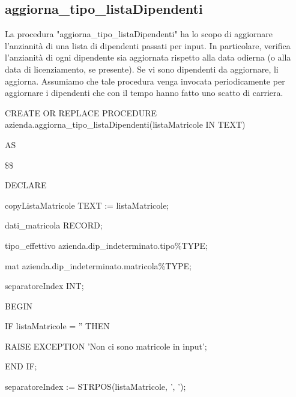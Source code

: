         \subsection{aggiorna\_tipo\_listaDipendenti}
        La procedura "aggiorna\_tipo\_listaDipendenti" ha lo scopo di aggiornare l'anzianità di una lista di dipendenti passati per input. In particolare, verifica l'anzianità di ogni dipendente sia aggiornata rispetto alla data odierna (o alla data di licenziamento, se presente). Se vi sono dipendenti da aggiornare, li aggiorna.
        Assumiamo che tale procedura venga invocata periodicamente per aggiornare i dipendenti che con il tempo hanno fatto uno scatto di carriera.
        \ttfamily
            \begin{flushleft}
                \begin{description}
                    \item CREATE OR REPLACE PROCEDURE azienda.aggiorna\_tipo\_listaDipendenti(listaMatricole IN TEXT)  
                    \item AS
                    \item \$\$
                    \item DECLARE
                    \begin{description}
                        \item copyListaMatricole TEXT := listaMatricole;
                        \item dati\_matricola RECORD;
                        \item tipo\_effettivo azienda.dip\_indeterminato.tipo\%TYPE;
                        \item mat azienda.dip\_indeterminato.matricola\%TYPE;
                        \item separatoreIndex INT;
                    \end{description}
                    \item BEGIN 
                    \begin{description}
                        \item IF listaMatricole = '' THEN
                        \begin{description}
                            \item RAISE EXCEPTION 'Non ci sono matricole in input';
                        \end{description}
                        \item END IF;
                        \item separatoreIndex := STRPOS(listaMatricole, ', ');
                        

\end{description}
\end{description}
\end{flushleft}
